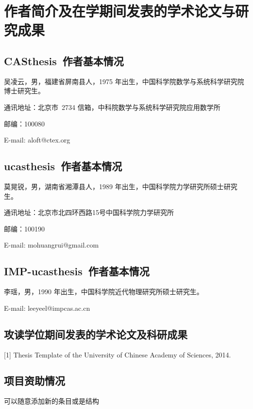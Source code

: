 \chapter{作者简介及在学期间发表的学术论文与研究成果}

\section*{CASthesis~作者基本情况}

吴凌云，男，福建省屏南县人，1975 年出生，中国科学院数学与系统科学研究院博士研究生。

通讯地址：北京市~2734 信箱，中科院数学与系统科学研究院应用数学所

邮编：100080

E-mail: aloft@ctex.org

\section*{ucasthesis~作者基本情况}

莫晃锐，男，湖南省湘潭县人，1989 年出生，中国科学院力学研究所硕士研究生。

通讯地址：北京市北四环西路15号中国科学院力学研究所

邮编：100190

E-mail: mohuangrui@gmail.com

\section*{IMP-ucasthesis~作者基本情况}

李瑶，男，1990 年出生，中国科学院近代物理研究所硕士研究生。

E-mail: leeyeel@impcas.ac.cn

\section*{攻读学位期间发表的学术论文及科研成果}

[1] Thesis Template of the University of Chinese Academy of Sciences, 2014.

\section*{项目资助情况}

可以随意添加新的条目或是结构



